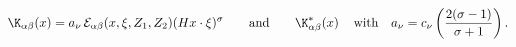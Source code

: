 \begin{equation}\label{eq:sol}
\K_{\alpha\beta}(x)=a_{\nu}\,{\cal
E}_{\alpha\beta}(x,\xi,Z_1,Z_2)(Hx\cdot\xi)^{\sigma}
\qquad\mbox{and}\qquad \K_{\alpha\beta}^{*}(x)\,
\quad\mbox{with}\quad
a_{\nu}=c_{\nu}\left(\frac{2(\sigma-1)}{\sigma+1}\right).\end{equation}


